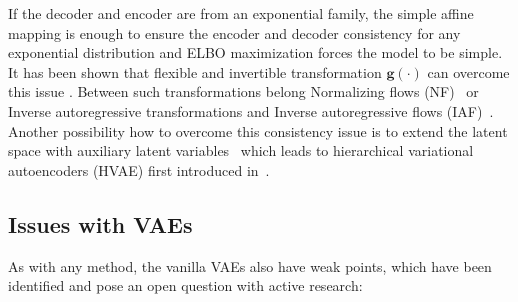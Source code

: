 If the decoder and encoder are from an exponential family, the simple affine mapping is enough to ensure the encoder and decoder 
consistency for any exponential distribution \cite{approx-error-2022} and ELBO maximization forces the model to be simple. 
It has been shown that flexible and invertible transformation $\boldsymbol{g}(\cdot)$ can overcome this issue \cite{approx-error-2022,diag-vae-2019}.
Between such transformations belong Normalizing flows (NF)~\cite{nf-2015} or Inverse autoregressive transformations and 
Inverse autoregressive flows (IAF)~\cite{iaf-2016}. 
Another possibility how to overcome this consistency issue is to extend the latent space with auxiliary latent variables~\cite{aux-var-2016}
which leads to hierarchical variational autoencoders (HVAE) first introduced in~\cite{lvae-2016}.

\subsection{Issues with VAEs}
As with any method, the vanilla VAEs also have weak points, which have been identified and pose an open question with active research:
